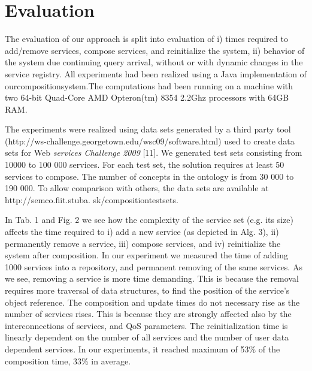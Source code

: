 \documentclass[10pt]{llncs}
\begin{document}
\section{Evaluation}
The evaluation of our approach is split into evaluation of i) times required to add/remove services, compose services, and reinitialize the system, ii) behavior of the system due continuing query arrival, without or with dynamic changes in the service registry. All experiments had been realized using a Java implementation of ourcompositionsystem.The computations had been running on a machine with two 64-bit Quad-Core AMD Opteron(tm) 8354 2.2Ghz processors with 64GB RAM. 

The experiments were realized using data sets generated by a third party tool (\tiny{http://ws-challenge.georgetown.edu/wsc09/software.html}\normalsize) used to create data sets for Web \textit{services Challenge 2009} [11]. We generated test sets consisting from 10000 to 100 000 services. For each test set, the solution requires at least 50 services to compose. The number of concepts in the ontology is from 30 000 to 190 000. To allow comparison with others, the data sets are available at \tiny http://semco.fiit.stuba. sk/compositiontestsets.
\normalsize

 In Tab. 1 and Fig. 2 we see how the complexity of the service set (e.g. its size) affects the time required to i) add a new service (as depicted in Alg. 3), ii) permanently remove a service, iii) compose services, and iv) reinitialize the system after composition. In our experiment we measured the time of adding 1000 services into a repository, and permanent removing of the same services. As we see, removing a service is more time demanding. This is because the removal requires more traversal of data structures, to ﬁnd the position of the service’s object reference. The composition and update times do not necessary rise as the number of services rises. This is because they are strongly affected also by the interconnections of services, and QoS parameters. The reinitialization time is linearly dependent on the number of all services and the number of user data dependent services. In our experiments, it reached maximum of 53\% of the composition time, 33\% in average.
\end{document}
